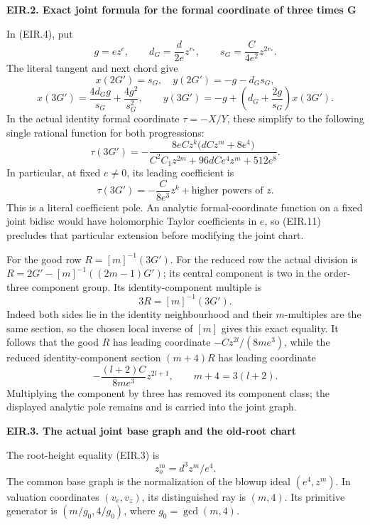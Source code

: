 \par

\medskip\noindent\textbf{EIR.2. Exact joint formula for the formal coordinate of three times G}

\par\nobreak

In (EIR.4), put
\[
 g=ez^c,\qquad d_G=\frac d{2e}z^{r_*},\qquad
 s_G=\frac C{4e^2}z^{2r_*}.
\]
The literal tangent and next chord give
\[
 x(2G')=s_G,\quad y(2G')=-g-d_Gs_G,
\]
\[
 x(3G')=\frac{4d_Gg}{s_G}+\frac{4g^2}{s_G^2},\qquad
 y(3G')=-g+\left(d_G+\frac{2g}{s_G}\right)x(3G').
 \tag{EIR.9}
\]
In the actual identity formal coordinate \(\tau=-X/Y\), these simplify
to the following single rational function for both progressions:
\[
 \tau(3G')=
 -\frac{8eCz^k\bigl(dCz^m+8e^4\bigr)}
 {C^2C_1z^{2m}+96dCe^4z^m+512e^8}.
 \tag{EIR.10}
\]
In particular, at fixed \(e\ne0\), its leading coefficient is
\[
 \tau(3G')=-\frac C{8e^3}z^k+\text{higher powers of }z.
 \tag{EIR.11}
\]
This is a literal coefficient pole. An analytic formal-coordinate
function on a fixed joint bidisc would have holomorphic Taylor
coefficients in \(e\), so (EIR.11) precludes that particular
extension before modifying the joint chart.

For the good row \(R=[m]^{-1}(3G')\). For the reduced row the
actual division is
\(R=2G'-[m]^{-1}((2m-1)G')\); its central component is two in the
order-three component group. Its identity-component multiple is
\[
 3R=[m]^{-1}(3G').
 \tag{EIR.12}
\]
Indeed both sides lie in the identity neighbourhood and their
\(m\)-multiples are the same section, so the chosen local inverse
of \([m]\) gives this exact equality. It follows that the good
\(R\) has leading coordinate \(-Cz^{2l}/(8me^3)\), while the
reduced identity-component section \((m+4)R\) has leading coordinate
\[
 -\frac{(l+2)C}{8me^3}z^{2l+1},\qquad m+4=3(l+2).
 \tag{EIR.13}
\]
Multiplying the component by three has removed its component class;
the displayed analytic pole remains and is carried into the joint graph.

\par

\medskip\noindent\textbf{EIR.3. The actual joint base graph and the old-root chart}

\par\nobreak

The root-height equality (EIR.3) is
\[
 z_o^m=d^3z^m/e^4.
 \tag{EIR.14}
\]
The common base graph is the normalization of the blowup ideal
\((e^4,z^m)\). In valuation coordinates \((v_e,v_z)\), its
distinguished ray is \((m,4)\). Its primitive generator is
\((m/g_0,4/g_0)\), where \(g_0=\gcd(m,4)\).

